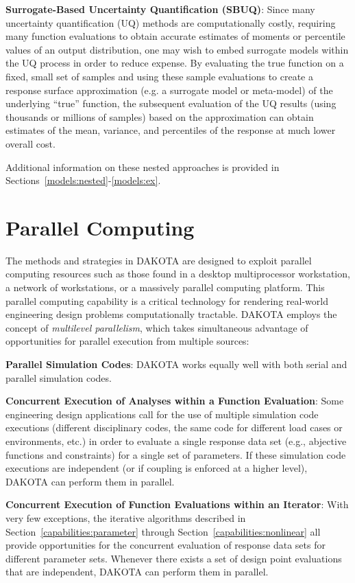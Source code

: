 \textbf{Surrogate-Based Uncertainty Quantification (SBUQ)}: 
Since many uncertainty quantification (UQ) methods are computationally
costly, requiring many function evaluations to obtain accurate
estimates of moments or percentile values of an output distribution,
one may wish to embed surrogate models within the UQ process in order
to reduce expense.  By evaluating the true function on a fixed, small
set of samples and using these sample evaluations to create a response
surface approximation (e.g. a surrogate model or meta-model) of the
underlying ``true'' function, the subsequent evaluation of the UQ
results (using thousands or millions of samples) based on the
approximation can obtain estimates of the mean, variance, and
percentiles of the response at much lower overall cost.

Additional information on these nested approaches is provided in
Sections~\ref{models:nested}-\ref{models:ex}.

\section{Parallel Computing}\label{capabilities:parallel}

The methods and strategies in DAKOTA are designed to exploit parallel
computing resources such as those found in a desktop multiprocessor
workstation, a network of workstations, or a massively parallel
computing platform. This parallel computing capability is a critical
technology for rendering real-world engineering design problems
computationally tractable. DAKOTA employs the concept of
\emph{multilevel parallelism}, which takes simultaneous advantage of
opportunities for parallel execution from multiple sources:

\textbf{Parallel Simulation Codes}: DAKOTA works equally well with both
serial and parallel simulation codes.

\textbf{Concurrent Execution of Analyses within a Function Evaluation}:
Some engineering design applications call for the use of multiple
simulation code executions (different disciplinary codes, the same
code for different load cases or environments, etc.) in order to
evaluate a single response data set (e.g., abjective functions and
constraints) for a single set of parameters. If these simulation code
executions are independent (or if coupling is enforced at a higher
level), DAKOTA can perform them in parallel.

\textbf{Concurrent Execution of Function Evaluations within an Iterator}:
With very few exceptions, the iterative algorithms described in
Section~\ref{capabilities:parameter} through
Section~\ref{capabilities:nonlinear} all provide opportunities for the
concurrent evaluation of response data sets for different parameter
sets. Whenever there exists a set of design point evaluations that are
independent, DAKOTA can perform them in parallel.


